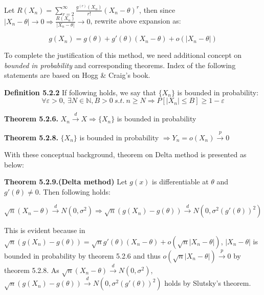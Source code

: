 \documentclass[10pt]{article}
\begin{document}
\noindent Let $R(X_n)=\sum_{r=2}^{\infty}\frac{g^{(r)}(X_n)}{r!}(X_n-\theta)^r$, then since $|X_n-\theta|\rightarrow 0\Rightarrow \frac{R(X_n)}{|X_n-\theta|}\rightarrow 0$, rewrite above expansion as:

$$
g(X_n)=g(\theta)+g'(\theta)(X_n-\theta)+o(|X_n-\theta|)
$$

\noindent To complete the justification of this method, we need additional concept on \textit{bounded in probability} and corresponding theorems. Index of the following statements are based on Hogg \& Craig's book.\bigskip

\noindent \textbf{Definition 5.2.2} If following holds, we say that $\{X_n\}$ is bounded in probability:
$$
\forall \varepsilon>0,\ \exists N\in \mathbb{N}, B>0\ s.t.\ n\geq N \Rightarrow P[|X_n|\leq B]\geq 1-\varepsilon
$$

\noindent \textbf{Theorem 5.2.6.} $X_n \overset{d}{\to} X \Rightarrow \{X_n\}$ is bounded in probability

\noindent \textbf{Theorem 5.2.8.} $\{X_n\}$ is bounded in probability $\Rightarrow Y_n=o(X_n) \overset{p}{\to}0$\bigskip

\noindent With these conceptual background, theorem on Delta method is presented as below:\bigskip

\noindent \textbf{Theorem 5.2.9.(Delta method)} Let $g(x)$ is differentiable at $\theta$ and $g'(\theta)\neq 0$. Then following holds:

$$
\sqrt{n}(X_n-\theta) \overset{d}{\to} N(0, \sigma^2) \Rightarrow \sqrt{n}(g(X_n)-g(\theta)) \overset{d}{\to} N(0, \sigma^2(g'(\theta))^2)
$$\bigskip

\noindent This is evident because in $\sqrt{n}(g(X_n)-g(\theta))=\sqrt{n}g'(\theta)(X_n-\theta)+o(\sqrt{n}|X_n-\theta|)$, $|X_n-\theta|$ is bounded in probability by theorem 5.2.6 and thus $o(\sqrt{n}|X_n-\theta|) \overset{p}{\to} 0$ by theorem 5.2.8. As $\sqrt{n}(X_n-\theta) \overset{d}{\to} N(0,\sigma^2)$, $\sqrt{n}(g(X_n)-g(\theta)) \overset{d}{\to} N(0, \sigma^2(g'(\theta))^2)$ holds by Slutsky's theorem.
\end{document}
